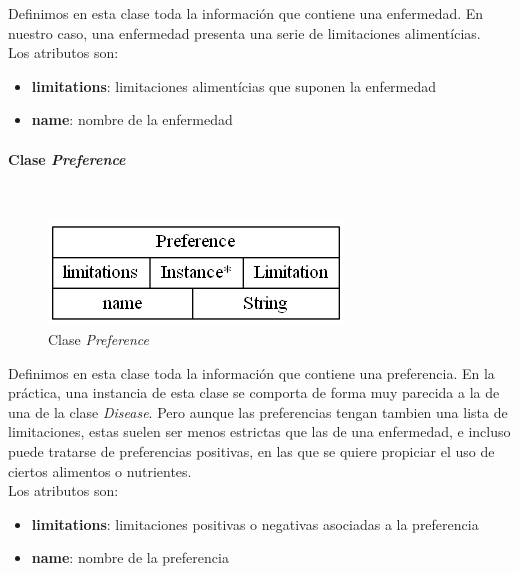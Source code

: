 \documentclass[11]{article}
\begin{document}
Definimos en esta clase toda la información que contiene una enfermedad. En nuestro caso, una enfermedad presenta una serie de limitaciones alimentícias.
\\

Los atributos son: 
\begin{itemize}
\item \textbf{limitations}: limitaciones alimentícias que suponen la enfermedad
\item \textbf{name}: nombre de la enfermedad
\end{itemize}

\vspace{0.5cm}

\paragraph{Clase \emph{Preference}}\mbox{}\\
\begin{figure}[H]
\centering
\includegraphics[scale=0.5]{images/class_Preference.png}
\caption{Clase \emph{Preference}}
\label{fig_class_Preference}
\end{figure}

Definimos en esta clase toda la información que contiene una preferencia. En la práctica, una instancia de esta clase se comporta de forma muy parecida a la de una de la clase \emph{Disease}. Pero aunque las preferencias tengan tambien una lista de limitaciones, estas suelen ser menos estrictas que las de una enfermedad, e incluso puede tratarse de preferencias positivas, en las que se quiere propiciar el uso de ciertos alimentos o nutrientes.
\\

Los atributos son: 
\begin{itemize}
\item \textbf{limitations}: limitaciones positivas o negativas asociadas a la preferencia
\item \textbf{name}: nombre de la preferencia
\end{itemize}

\vspace{0.5cm}
\end{document}
